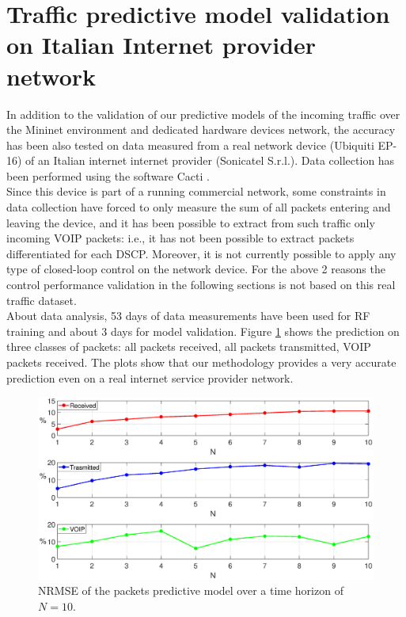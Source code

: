 \section{Traffic predictive model validation on Italian Internet provider network}
In addition to the validation of our predictive models of the incoming traffic over the Mininet environment and dedicated hardware devices network, the accuracy has been also tested on data measured from a real network device (Ubiquiti EP-16) of an Italian internet internet provider (Sonicatel S.r.l.). Data collection has been performed using the software Cacti \cite{Cacti}.\\
Since this device is part of a running commercial network, some constraints in data collection have forced to only measure the sum of all packets entering and leaving the device, and it has been possible to extract from such traffic only incoming VOIP packets: i.e., it has not been possible to extract packets differentiated for each DSCP. Moreover, it is not currently possible to apply any type of closed-loop control on the network device. For the above 2 reasons the control performance validation in the following sections is not based on this real traffic dataset.\\
About data analysis, 53 days of data measurements have been used for RF training and about 3 days for model validation. Figure \ref{fig:{errorPescara}} shows the prediction on three classes of packets: all packets received, all packets transmitted, VOIP packets received. The plots show that our methodology provides a very accurate prediction even on a real internet service provider network.
\begin{figure}[h!]
	\centering
	\includegraphics[trim={120 0 120 0}, width=1\linewidth]{figure/Error_PESCARA_DATA.eps}
	\caption{NRMSE of the packets predictive model over a time horizon of $N=10$.}
	\label{fig:{errorPescara}}
\end{figure}